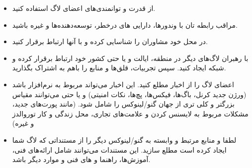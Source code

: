 \begin{itemize}
\item
از قدرت و توانمندی‌های اعضای لاگ استفاده کنید.
\item
مراقب رابطه تان با وندورها، دارایی های درخطر، توسعه‌دهنده‌ها و غیره باشید.
\item
در محل خود مشاوران را شناسایی کرده و با آنها ارتباط برقرار کنید.
\item
با رهبران لاگ‌های دیگر در منطقه، ایالت و یا حتی کشور خود ارتباط برقرار کرده
و شبکه ایجاد کنید. سپس تجربیات، قلق‌ها و منابع را باهم به اشتراک بگذارید.
\item
اعضای لاگ را از اخبار مطلع کنید. این اخبار می‌تواند مربوط به نرم‌افزار باشد
(ورژن جدید کرنل، باگ‌ها، فیکس‌ها، پچ‌ها، نکات امنیتی) و یا حتی می‌توانند مقیاس
بزرگتر و کلی تری از جهان گنو/لینوکس را شامل شود. (مانند پورت‌های جدید،
مشکلات مربوط به لایسنس کردن و علامت‌های تجاری، محل زندگی و کار توروالدز و غیره)
\item
لطفا
و منابع مرتبط و وابسته به گنو/لینوکس دیگر را از مستنداتی که لاگ شما
ایجاد کرده است مطلع سازید. این مستندات می‌توانند شامل ارائه‌های فنی،
آموزش‌ها، راهنما و  های فنی و موارد دیگر باشد.

\end{itemize}

